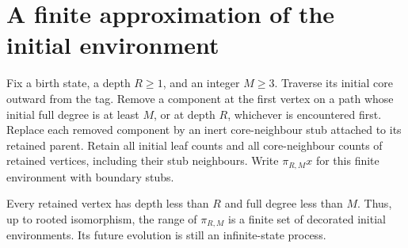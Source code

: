 \section{A finite approximation of the initial environment}

Fix a birth state, a depth $R\ge1$, and an integer $M\ge3$.
Traverse its initial core outward from the tag. Remove a component at
the first vertex on a path whose initial full degree is at least $M$,
or at depth $R$, whichever is encountered first. Replace each removed
component by an inert core-neighbour stub attached to its retained parent.
Retain all initial leaf counts and all core-neighbour counts of retained
vertices, including their stub neighbours. Write $\pi_{R,M}x$ for this
finite environment with boundary stubs.

Every retained vertex has depth less than $R$ and full degree less than
$M$. Thus, up to rooted isomorphism, the range of $\pi_{R,M}$ is a
finite set of decorated initial environments. Its future evolution is
still an infinite-state process.

